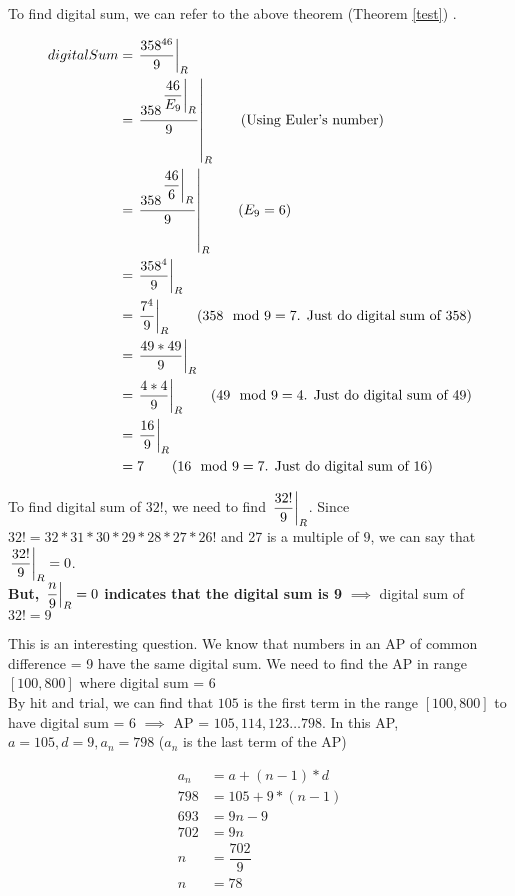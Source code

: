 To find digital sum, we can refer to the above theorem (Theorem \ref{test}) . 

\begin{align*}
    digitalSum &= \displaystyle{ \left. \frac{358^{46}}{9} \right |_{R} } \\
    &= \displaystyle{ \left. \frac{358^{\displaystyle{ \left. \frac{46}{E_9} \right |_{R} }}}{9} \right |_{R} } \tag{Using Euler's number} \\
    &= \displaystyle{ \left. \frac{358^{\displaystyle{ \left. \frac{46}{6} \right |_{R} }}}{9} \right |_{R} } \tag{$E_9 = 6$} \\
    &= \displaystyle{ \left. \frac{358^{4}}{9} \right |_{R} } \\
    &= \displaystyle{ \left. \frac{7^{4}}{9} \right |_{R} } \tag{$358 \mod 9 = 7$. Just do digital sum of 358} \\
    &= \displaystyle{ \left. \frac{49 * 49}{9} \right |_{R} } \\
    &= \displaystyle{ \left. \frac{4 * 4}{9} \right |_{R} } \tag{$49 \mod 9 = 4$. Just do digital sum of 49} \\
    &= \displaystyle{ \left. \frac{16}{9} \right |_{R} } \\
    &= 7 \tag{$16 \mod 9 = 7$. Just do digital sum of 16}
\end{align*}


To find digital sum of $32!$, we need to find $\displaystyle{ \left. \frac{32!}{9} \right |_{R} }$. Since $32! = 32 * 31 * 30 * 29 * 28 * 27 * 26!$ and 27 is a multiple of $9$, we can say that $\displaystyle{ \left. \frac{32!}{9} \right |_{R} } = 0$. \\ 

\textbf{But, $\displaystyle{ \left. \frac{n}{9} \right |_{R} } = 0$ indicates that the digital sum is 9} $\implies$ digital sum of $32! = 9$


This is an interesting question. We know that numbers in an AP of common difference = 9 have the same digital sum. We need to find the AP in range $[100,800]$ where digital sum = 6 \\

By hit and trial, we can find that $105$ is the first term in the range $[100,800]$ to have digital sum = 6 $\implies$ AP = $105,114,123 \ldots 798$. In this AP, $a = 105, d = 9, a_n = 798$ ($a_n$ is the last term of the AP)

\begin{align*}
    a_n &= a + (n-1) * d \\
    798 &= 105 + 9 * (n - 1) \\
    693 &= 9n - 9 \\
    702 &= 9n \\
    n &= \dfrac{702}{9} \\
    n &= 78 
\end{align*}

